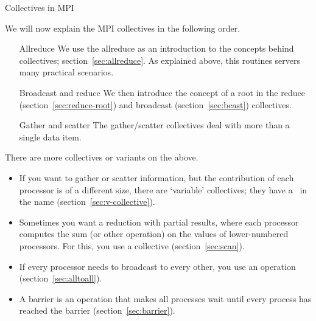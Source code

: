  {Collectives in MPI}

We will now explain the MPI collectives in the following order.
\begin{itemize}
\item[Allreduce] We use the allreduce as an introduction to the
  concepts behind collectives; section~\ref{sec:allreduce}. As
  explained above, this routines servers many practical scenarios.
\item[Broadcast and reduce] We then introduce the concept of a root
  in the reduce (section~\ref{sec:reduce-root}) and broadcast
  (section~\ref{sec:bcast}) collectives.
\item[Gather and scatter] The gather/scatter collectives deal with
  more than a single data item.
\end{itemize}

There are more collectives or variants on the above.
\begin{itemize}
\item If you want to gather or scatter information, but the contribution
  of each processor is of a different size, there are `variable' collectives;
  they have a~ in the name (section~\ref{sec:v-collective}).
\item Sometimes you want a reduction with partial results, where each processor
  computes the sum (or other operation) on the values of lower-numbered processors.
  For this, you use a  collective (section~\ref{sec:scan}).
\item If every processor needs to broadcast to every other, you use an
   operation (section~\ref{sec:alltoall}).
\item A barrier is an operation that makes all processes wait until every
  process has reached the barrier (section~\ref{sec:barrier}).
\end{itemize}

\begin{comment}
  Thus, MPI has the following operations:
  \begin{itemize}
  \item \indexmpishow{MPI_Allreduce} is equivalent to a
    \indexmpishow{MPI_Reduce} followed by a broadcast.
  \item \indexmpishow{MPI_Allgather} is equivalent to a
    \indexmpishow{MPI_Gather} followed by a broadcast.
  \item \indexmpishow{MPI_Allgatherv} is equivalent to an
    \indexmpishow{MPI_Gatherv} followed by a broadcast.
  \item \indexmpishow{MPI_Alltoall}, \indexmpishow{MPI_Alltoallv}.
  \end{itemize}
\end{comment}

